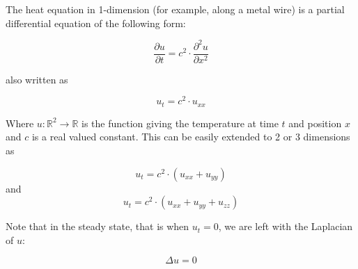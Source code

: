 \documentclass[12pt]{article}
\begin{document}
The heat equation in 1-dimension (for example, along a metal wire) is a partial differential equation of the following form:

$$\frac{\partial u}{\partial t} = c^2 \cdot \frac{\partial^2 u}{\partial x^2}$$

also written as

$$u_{t} = c^2 \cdot u_{xx}$$

Where $u:\mathbb{R}^2\to\mathbb{R}$ is the function giving the temperature at time $t$ and position $x$ and $c$ is a real valued constant. This can be easily extended to 2 or 3 dimensions as

$$u_{t} = c^2 \cdot ( u_{xx} + u_{yy} )$$
and
$$u_{t} = c^2 \cdot ( u_{xx} + u_{yy} + u_{zz} )$$

Note that in the steady state, that is when $u_{t} = 0$, we are left with the Laplacian of $u$:

$$\Delta u = 0 $$
\end{document}
